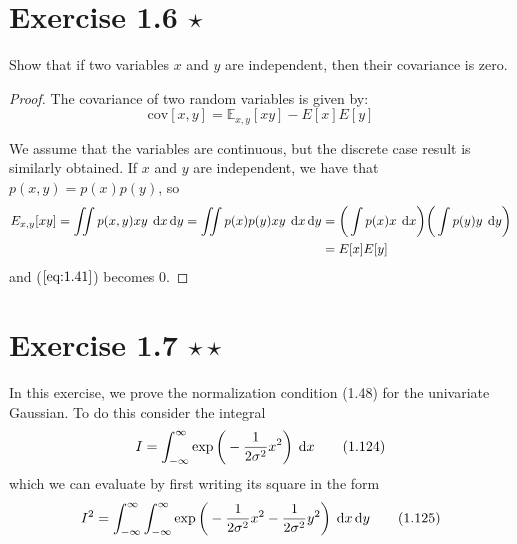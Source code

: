 \section*{Exercise 1.6 $\star$}
Show that if two variables $x$ and $y$ are independent, then their covariance is zero.

\vspace{1em}

\begin{proof}
    The covariance of two random variables is given by:
    \begin{equation*}
        \text{cov}[x, y] = \mathbb{E}_{x, y} [xy] - E[x]E[y]
        \tag{1.41}\label{eq:1.41}
    \end{equation*}

    We assume that the variables are continuous, but the discrete case result is similarly obtained.
    If $x$ and $y$ are independent, we have that $p(x, y) = p(x)p(y)$, so
    \begin{align*}
         E_{x, y}[xy] = \iint p(x, y) xy \hspace{0.25em} \mathop{}\!\mathrm{d} x \mathop{}\!\mathrm{d} y 
         = \iint p(x) p(y) xy \hspace{0.25em} \mathop{}\!\mathrm{d} x \mathop{}\!\mathrm{d} y
         &= \bigg(\int p(x) x \hspace{0.25em} \mathop{}\!\mathrm{d} x\bigg) \bigg(\int p(y) y \hspace{0.25em} \mathop{}\!\mathrm{d} y\bigg) \\
         &= E[x]E[y]
    \end{align*}
    and ($\ref{eq:1.41}$) becomes 0.
\end{proof}

\section*{Exercise 1.7 $\star \star$}
In this exercise, we prove the normalization condition (1.48) for the univariate
Gaussian. To do this consider the integral
\begin{equation*}
    I = \int_{-\infty}^{\infty} \exp\bigg(-\frac{1}{2\sigma^2}x^2\bigg) \hspace{0.25em} \mathop{}\!\mathrm{d} x
    \tag{1.124}\label{eq:1.124}
\end{equation*}
which we can evaluate by first writing its square in the form
\begin{equation*}
    I^2 = \int_{-\infty}^{\infty} \int_{-\infty}^{\infty} \exp 
        \bigg(-\frac{1}{2\sigma^2}x^2 - \frac{1}{2\sigma^2}y^2\bigg) \hspace{0.25em} \mathop{}\!\mathrm{d} x\mathop{}\!\mathrm{d} y
    \tag{1.125}\label{eq:1.125}
\end{equation*}


